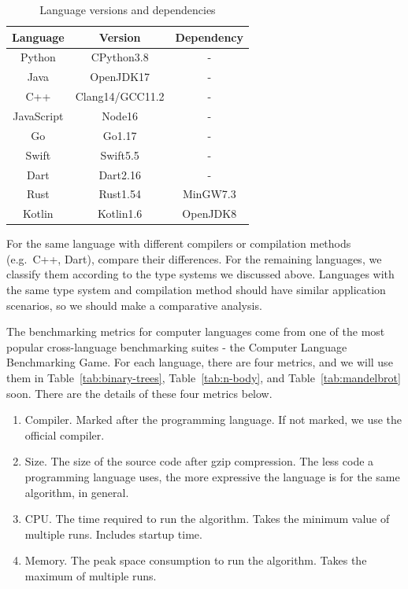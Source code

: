 \begin{table}[htbp]
    \caption{Language versions and dependencies}
    \label{tab:version}
    \begin{center}
        \begin{tabular}{ccc}
            \toprule
            Language   & Version         & Dependency \\
            \midrule
            Python     & CPython3.8      & -          \\
            Java       & OpenJDK17       & -          \\
            C++        & Clang14/GCC11.2 & -          \\
            JavaScript & Node16          & -          \\
            Go         & Go1.17          & -          \\
            Swift      & Swift5.5        & -          \\
            Dart       & Dart2.16        & -          \\
            Rust       & Rust1.54        & MinGW7.3   \\
            Kotlin     & Kotlin1.6       & OpenJDK8   \\
            \bottomrule
        \end{tabular}
    \end{center}
\end{table}

For the same language with different compilers or compilation methods (e.g.\ C++, Dart), compare their differences.
For the remaining languages, we classify them according to the type systems we discussed above.
Languages with the same type system and compilation method should have similar application scenarios,
so we should make a comparative analysis.

The benchmarking metrics for computer languages come from one of the
most popular cross-language benchmarking suites -
the Computer Language Benchmarking Game\cite{gouy2017computer}.
For each language, there are four metrics, and we will use them
in Table~\ref{tab:binary-trees}, Table~\ref{tab:n-body}, and Table~\ref{tab:mandelbrot} soon.
There are the details of these four metrics below.

\begin{enumerate}
    \item Compiler.
    Marked after the programming language.
    If not marked, we use the official compiler.
    \item Size.
    The size of the source code after gzip compression.
    The less code a programming language uses, the more expressive the language is for the same algorithm, in general.
    \item CPU. The time required to run the algorithm.
    Takes the minimum value of multiple runs.
    Includes startup time.
    \item Memory.
    The peak space consumption to run the algorithm.
    Takes the maximum of multiple runs.
\end{enumerate}

